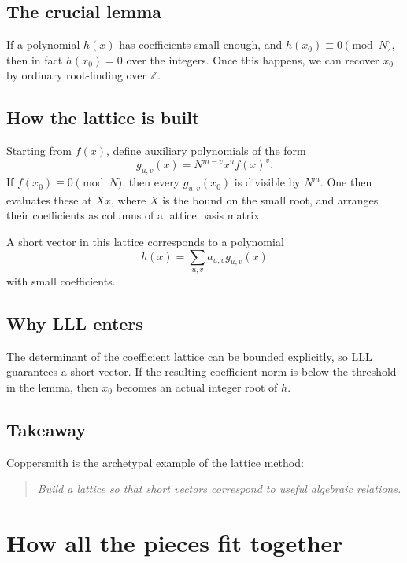 \documentclass[11pt]{article}
\newcommand{\Z}{\mathbb{Z}}
\begin{document}
\subsection{The crucial lemma}
If a polynomial $h(x)$ has coefficients small enough, and $h(x_0)\equiv 0\pmod N$, then in fact $h(x_0)=0$ over the integers. Once this happens, we can recover $x_0$ by ordinary root-finding over $\Z$.

\subsection{How the lattice is built}
Starting from $f(x)$, define auxiliary polynomials of the form
\[
g_{u,v}(x)=N^{m-v}x^u f(x)^v.
\]
If $f(x_0)\equiv 0\pmod N$, then every $g_{u,v}(x_0)$ is divisible by $N^m$. One then evaluates these at $Xx$, where $X$ is the bound on the small root, and arranges their coefficients as columns of a lattice basis matrix.

A short vector in this lattice corresponds to a polynomial
\[
h(x)=\sum_{u,v} a_{u,v} g_{u,v}(x)
\]
with small coefficients.

\subsection{Why LLL enters}
The determinant of the coefficient lattice can be bounded explicitly, so LLL guarantees a short vector. If the resulting coefficient norm is below the threshold in the lemma, then $x_0$ becomes an actual integer root of $h$.

\subsection{Takeaway}
Coppersmith is the archetypal example of the lattice method:
\begin{quote}
\emph{Build a lattice so that short vectors correspond to useful algebraic relations.}
\end{quote}

\section{How all the pieces fit together}
\end{document}
